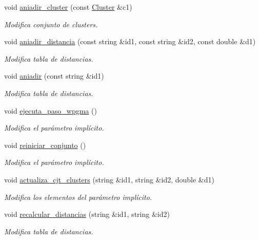 \begin{DoxyCompactItemize}
void \hyperlink{class_cjt___clusters_a24a17b55baa8d3aba4df83e9b61508fa}{aniadir\+\_\+cluster} (const \hyperlink{class_cluster}{Cluster} \&c1)
\begin{DoxyCompactList}\small\item\em Modifica conjunto de clusters. \end{DoxyCompactList}\item 
void \hyperlink{class_cjt___clusters_aa6b67053039c17daaa752db7ca9d62bb}{aniadir\+\_\+distancia} (const string \&id1, const string \&id2, const double \&d1)
\begin{DoxyCompactList}\small\item\em Modifica tabla de distancias. \end{DoxyCompactList}\item 
void \hyperlink{class_cjt___clusters_a8f2627ad9c0af787c781ec38be8a8171}{aniadir} (const string \&id1)
\begin{DoxyCompactList}\small\item\em Modifica tabla de distancias. \end{DoxyCompactList}\item 
void \hyperlink{class_cjt___clusters_a74ce6f42cecc4c26fea5a6ea21fa4123}{ejecuta\+\_\+paso\+\_\+wpgma} ()
\begin{DoxyCompactList}\small\item\em Modifica el parámetro implícito. \end{DoxyCompactList}\item 
void \hyperlink{class_cjt___clusters_a6ece0ade60c6bc9497f127b6ae0cfd23}{reiniciar\+\_\+conjunto} ()
\begin{DoxyCompactList}\small\item\em Modifica el parámetro implícito. \end{DoxyCompactList}\item 
void \hyperlink{class_cjt___clusters_a423d4312a548689125a245f32f4a87b5}{actualiza\+\_\+cjt\+\_\+clusters} (string \&id1, string \&id2, double \&d1)
\begin{DoxyCompactList}\small\item\em Modifica los elementos del parámetro implícito. \end{DoxyCompactList}\item 
void \hyperlink{class_cjt___clusters_a863e81011d5f5145a57e2e55470e89d4}{recalcular\+\_\+distancias} (string \&id1, string \&id2)
\begin{DoxyCompactList}\small\item\em Modifica tabla de distancias. \end{DoxyCompactList}\item 

\end{DoxyCompactItemize}

